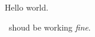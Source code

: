\documentclass{article}
\begin{document}
Hello world.\par
\LaTe~shoud be working \emph{fine}.
\end{document}
